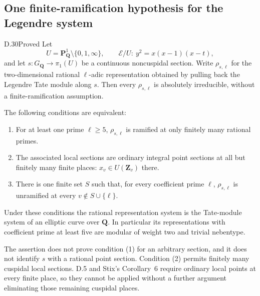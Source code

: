 \subsection{One finite-ramification hypothesis for the Legendre system}

\begin{claim}{D.30}{Proved}\label{clm:D30}
Let
\[
 U=\mathbf P^1_{\mathbf Q}\setminus\{0,1,\infty\},\qquad
 \mathcal E/U:\ y^2=x(x-1)(x-t),
\]
and let $s:G_{\mathbf Q}\to\pi_1(U)$ be a continuous
noncuspidal section. Write $\rho_{s,\ell}$ for the
two-dimensional rational $\ell$-adic representation obtained
by pulling back the Legendre Tate module along $s$.
Then every $\rho_{s,\ell}$ is absolutely irreducible,
without a finite-ramification assumption.

The following conditions are equivalent:
\begin{enumerate}
\item For at least one prime $\ell\ge5$, $\rho_{s,\ell}$
is ramified at only finitely many rational primes.
\item The associated local sections are ordinary integral
point sections at all but finitely many finite places:
$x_v\in U(\mathbf Z_v)$ there.
\item There is one finite set $S$ such that, for every
coefficient prime $\ell$, $\rho_{s,\ell}$ is unramified
at every $v\notin S\cup\{\ell\}$.
\end{enumerate}
Under these conditions the rational representation system
is the Tate-module system of an elliptic curve over
$\mathbf Q$. In particular its representations with
coefficient prime at least five are modular of weight two
and trivial nebentype.

The assertion does not prove condition \textup{(1)} for
an arbitrary section, and it does not identify $s$ with
a rational point section. Condition \textup{(2)} permits
finitely many cuspidal local sections. D.5 and Stix's
Corollary~6 require ordinary local points at every finite
place, so they cannot be applied without a further argument
eliminating those remaining cuspidal places.
\end{claim}

